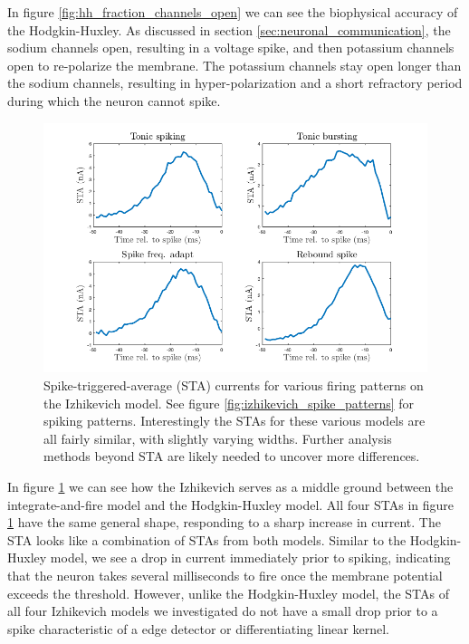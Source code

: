 \documentclass[11pt]{article}
\begin{document}
In figure \ref{fig:hh_fraction_channels_open} we can see the biophysical accuracy of the Hodgkin-Huxley. As discussed in section \ref{sec:neuronal_communication}, the sodium channels open, resulting in a voltage spike, and then potassium channels open to re-polarize the membrane. The potassium channels stay open longer than the sodium channels, resulting in hyper-polarization and a short refractory period during which the neuron cannot spike.

\begin{figure}[H]
    \centering
    \includegraphics[width=6in]{figures/izhikevich_sta.png}
    \caption{Spike-triggered-average (STA) currents for various firing patterns on the Izhikevich model. See figure \ref{fig:izhikevich_spike_patterns} for spiking patterns. Interestingly the STAs for these various models are all fairly similar, with slightly varying widths. Further analysis methods beyond STA are likely needed to uncover more differences.}
    \label{fig:izhikevich_sta}
\end{figure}

In figure \ref{fig:izhikevich_sta} we can see how the Izhikevich serves as a middle ground between the integrate-and-fire model and the Hodgkin-Huxley model. All four STAs in figure \ref{fig:izhikevich_sta} have the same general shape, responding to a sharp increase in current. The STA looks like a combination of STAs from both models. Similar to the Hodgkin-Huxley model, we see a drop in current immediately prior to spiking, indicating that the neuron takes several milliseconds to fire once the membrane potential exceeds the threshold. However, unlike the Hodgkin-Huxley model, the STAs of all four Izhikevich models we investigated do not have a small drop prior to a spike characteristic of a edge detector or differentiating linear kernel.
\end{document}
